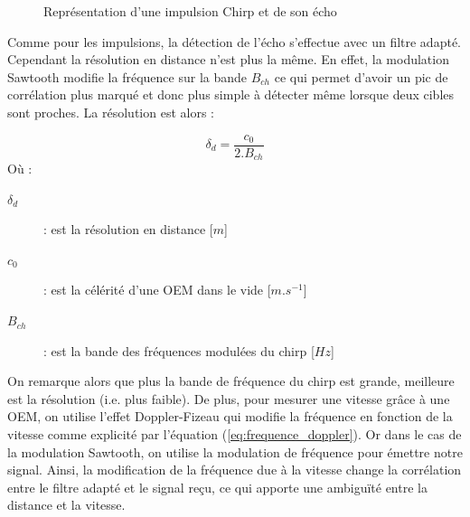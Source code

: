 \begin{figure}[htbp]
    \caption{Représentation d'une impulsion Chirp et de son écho}
    \label{fig:impulsions_chirp_avec_echo}
\end{figure}

Comme pour les impulsions, la détection de l'écho s'effectue avec un filtre adapté. Cependant la résolution en distance n'est plus la même. En effet, la modulation Sawtooth modifie la fréquence sur la bande $B_{ch}$ ce qui permet d'avoir un pic de corrélation plus marqué et donc plus simple à détecter même lorsque deux cibles sont proches. La résolution est alors \cite{cumming2005} : 

\begin{equation}
    \delta_d = \frac{c_0}{2.B_{ch}}
    \label{eq:resolution_en_distance_chirp}
\end{equation}
Où :
\begin{description}
    \item[$\delta_d$] : est la résolution en distance [$m$]
    \item[$c_0$] : est la célérité d'une OEM dans le vide [$m.s^{-1}$]
    \item[$B_{ch}$] : est la bande des fréquences modulées du chirp [$Hz$]
\end{description}

On remarque alors que plus la bande de fréquence du chirp est grande, meilleure est la résolution (i.e. plus faible). De plus, pour mesurer une vitesse grâce à une OEM, on utilise l'effet Doppler-Fizeau qui modifie la fréquence en fonction de la vitesse comme explicité par l'équation (\ref{eq:frequence_doppler}). Or dans le cas de la modulation Sawtooth, on utilise la modulation de fréquence pour émettre notre signal. Ainsi, la modification de la fréquence due à la vitesse change la corrélation entre le filtre adapté et le signal reçu, ce qui apporte une ambiguïté entre la distance et la vitesse.

